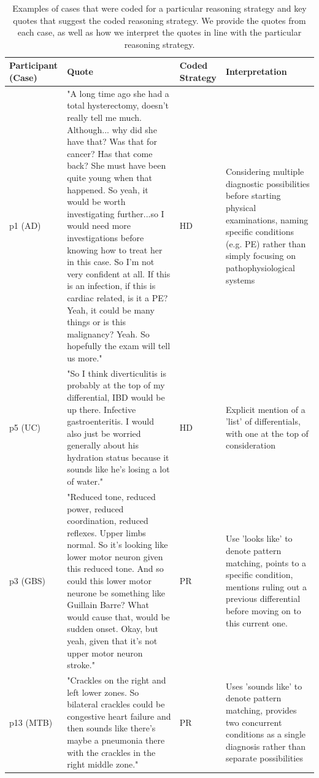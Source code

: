 \documentclass[a4paper, nobind]{templates/ociamthesis}
\begin{document}
\newpage

\begin{longtable}[t]{>{\raggedright\arraybackslash}p{6em}|>{\raggedright\arraybackslash}p{15em}|>{\raggedright\arraybackslash}p{4em}|>{\raggedright\arraybackslash}p{9em}}
\caption{\label{tab:strategyexamples}Examples of cases that were coded for a particular reasoning strategy and key quotes that suggest the coded reasoning strategy. We provide the quotes from each case, as well as how we interpret the quotes in line with the particular reasoning strategy.}\\
\hline
Participant (Case) & Quote & Coded Strategy & Interpretation\\
\hline
p1 (AD) & "A long time ago she had a total hysterectomy, doesn't really tell me much. Although... why did she have that? Was that for cancer? Has that come back? She must have been quite young when that happened. So yeah, it would be worth investigating further...so I would need more investigations before knowing how to treat her in this case. So I'm not very confident at all. If this is an infection, if this is cardiac related, is it a PE? Yeah, it could be many things or is this malignancy? Yeah. So hopefully the exam will tell us more." & HD & Considering multiple diagnostic possibilities before starting physical examinations, naming specific conditions (e.g. PE) rather than simply focusing on pathophysiological systems\\
\hline
p5 (UC) & "So I think diverticulitis is probably at the top of my differential, IBD would be up there. Infective gastroenteritis. I would also just be worried generally about his hydration status because it sounds like he's losing a lot of water." & HD & Explicit mention of a 'list' of differentials, with one at the top of consideration\\
\hline
p3 (GBS) & "Reduced tone, reduced power, reduced coordination, reduced reflexes. Upper limbs normal. So it's looking like lower motor neuron given this reduced tone. And so could this lower motor neurone be something like Guillain Barre? What would cause that, would be sudden onset. Okay, but yeah, given that it's not upper motor neuron stroke." & PR & Use 'looks like' to denote pattern matching, points to a specific condition, mentions ruling out a previous differential before moving on to this current one.\\
\hline
p13 (MTB) & "Crackles on the right and left lower zones. So bilateral crackles could be congestive heart failure and then sounds like there’s maybe a pneumonia there with the crackles in the right middle zone." & PR & Uses 'sounds like' to denote pattern matching, provides two concurrent conditions as a single diagnosis rather than separate possibilities\\

\end{longtable}
\end{document}
